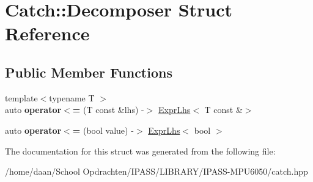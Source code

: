 \hypertarget{structCatch_1_1Decomposer}{}\section{Catch\+:\+:Decomposer Struct Reference}
\label{structCatch_1_1Decomposer}
\subsection*{Public Member Functions}
\begin{DoxyCompactItemize}
\item 
\mbox{\label{structCatch_1_1Decomposer_a20b5b8c0e2ff0328a019ae1a8deca03a}} 
{\footnotesize template$<$typename T $>$ }\\auto {\bfseries operator$<$=} (T const \&lhs) -\/$>$ \hyperlink{classCatch_1_1ExprLhs}{Expr\+Lhs}$<$ T const \&$>$
\item 
\mbox{\label{structCatch_1_1Decomposer_aac129b94903ae1339d5709049d83613b}} 
auto {\bfseries operator$<$=} (bool value) -\/$>$ \hyperlink{classCatch_1_1ExprLhs}{Expr\+Lhs}$<$ bool $>$
\end{DoxyCompactItemize}


The documentation for this struct was generated from the following file\+:\begin{DoxyCompactItemize}
\item 
/home/daan/\+School Opdrachten/\+I\+P\+A\+S\+S/\+L\+I\+B\+R\+A\+R\+Y/\+I\+P\+A\+S\+S-\/\+M\+P\+U6050/catch.\+hpp\end{DoxyCompactItemize}
